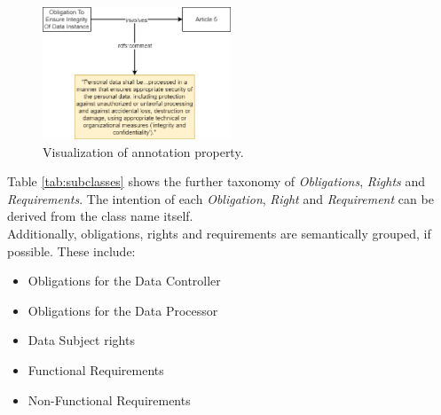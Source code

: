 \documentclass[
  a4paper,  %
  twoside,  %
  bibliography=totoc,
  headsepline,
  cleardoublepage=empty,
  parskip=half,
  draft=false
]{scrbook}
\begin{document}
\begin{figure}
  \centering
  \includegraphics[width=0.5\textwidth]{graphics/annotation.drawio.png}
  \caption{Visualization of annotation property.}
  \label{fig:annotationExample}
\end{figure}

 Table \ref{tab:subclasses} shows the further taxonomy of \textit{Obligations}, \textit{Rights} and \textit{Requirements}. The intention of each \textit{Obligation}, \textit{Right} and \textit{Requirement} can be derived from the class name itself. \\
Additionally, obligations, rights and requirements are semantically grouped, if possible. These include: \\

\begin{itemize}
    \item Obligations for the Data Controller
    \item Obligations for the Data Processor
    \item Data Subject rights
    \item Functional Requirements
    \item Non-Functional Requirements
\end{itemize}
\end{document}
